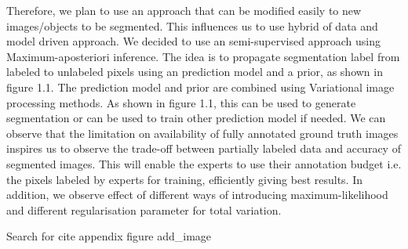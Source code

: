 

Therefore, we plan to use an approach that can be modified easily to new images/objects to be segmented. This influences us to use hybrid of data and model driven approach. We decided to use an semi-supervised approach using Maximum-aposteriori inference. The idea is to propagate segmentation label from labeled to unlabeled pixels using an prediction model and a prior, as shown in figure 1.1. The prediction model and prior are combined using Variational image processing methods. As shown in figure 1.1, this can be used to generate segmentation or can be used to train other prediction model if needed.
We can observe that the limitation on availability of fully annotated ground truth images inspires us to observe the trade-off between partially labeled data and accuracy of segmented images. This will enable the experts to use their annotation budget i.e. the pixels labeled by experts for training, efficiently giving best results. In addition, we observe effect of different ways of introducing maximum-likelihood and different regularisation parameter for total variation.

Search for 
cite
appendix
figure
add_image